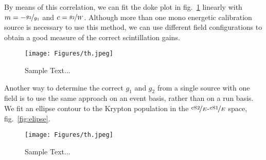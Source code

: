 By means of this correlation, we can fit the doke plot in fig.~\ref{fig:doke} linearly with $ m = - \nicefrac{g_2}{g_1} $ and $ c = \nicefrac{g_2}{W} $.  %
Although more than one mono energetic calibration source is necessary to use this method, we can use different field configurations to obtain a good measure of the correct scintillation gains.

\begin{figure}
\centering
\texttt{[image: Figures/th.jpeg]}  %
\caption[Doke plot]{
        Sample Text...
    }
\label{fig:doke}
\end{figure}

Another way to determine the correct $ g_1 $ and $ g_2 $ from a single source with one field is to use the same approach on an event basis, rather than on a run basis.
We fit an ellipse contour to the Krypton population in the $ \nicefrac{\mathrm{cS2}}{E} $-$ \nicefrac{\mathrm{cS1}}{E} $ space, fig.~\ref{fig:elipse}.

\begin{figure}
\centering
\texttt{[image: Figures/th.jpeg]}  %
\caption[Ellipse Fit]{
        Sample Text...
    }
\label{fig:ellipse}
\end{figure}



